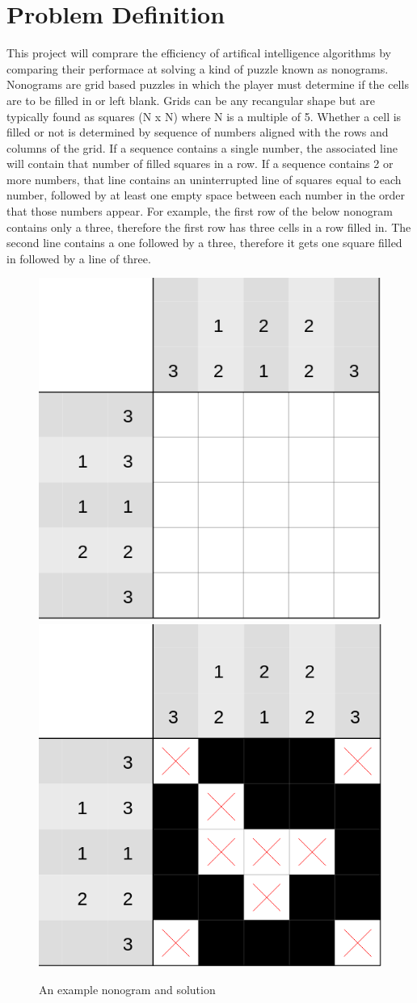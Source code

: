 \documentclass[12pt, letterpaper]{article}
\begin{document}
\nocite{*}



\tableofcontents
\newpage
{}
\setcounter{lastroman}{\value{page}}
\maketitle
\section{Problem Definition}
    This project will comprare the efficiency of artifical intelligence algorithms by comparing their performace at solving a kind of puzzle known as nonograms.  Nonograms are grid based puzzles in which the player must determine if the cells are to be filled in or left blank. Grids can be any recangular shape but are typically found as squares (N x N) where N is a multiple of 5. Whether a cell is filled or not is determined by sequence of numbers aligned with the rows and columns of the grid. If a sequence contains a single number, the associated line will contain that number of filled squares in a row. If a sequence contains 2 or more numbers, that line contains an uninterrupted line of squares equal to each number, followed by at least one empty space between each number in the order that those numbers appear. For example, the first row of the below nonogram contains only a three, therefore the first row has three cells in a row filled in. The second line contains a one followed by a  three, therefore it gets one square filled in followed by a line of three.


\begin{figure}[H]
    \centering
    {\includegraphics[width=0.4\linewidth]{fig/nonogram.png}}\hfill
    {\includegraphics[width=0.4\linewidth]{fig/canvas.png}}
        \caption{An example nonogram and solution}
    \label{fig:enter-label}
\end{figure}
\end{document}
